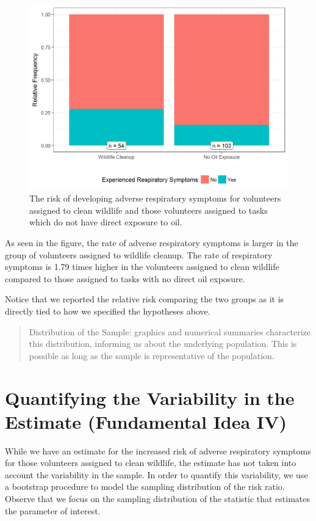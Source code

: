 \documentclass[]{book}
\theoremstyle{definition}
\theoremstyle{definition}
\theoremstyle{remark}
\begin{document}
\begin{figure}

{\centering \includegraphics[width=0.8\linewidth]{./Images/recaplanguage-deepwater-plot-1} 

}

\caption{The risk of developing adverse respiratory symptoms for volunteers assigned to clean wildlife and those volunteers assigned to tasks which do not have direct exposure to oil.}\label{fig:recaplanguage-deepwater-plot}
\end{figure}

As seen in the figure, the rate of adverse respiratory symptoms is
larger in the group of volunteers assigned to wildlife cleanup. The rate
of respiratory symptoms is 1.79 times higher in the volunteers assigned
to clean wildlife compared to those assigned to tasks with no direct oil
exposure.

Notice that we reported the relative risk comparing the two groups as it
is directly tied to how we specified the hypotheses above.

\begin{quote}
Distribution of the Sample: graphics and numerical summaries
characterize this distribution, informing us about the underlying
population. This is possible as long as the sample is representative of
the population.
\end{quote}

\section{Quantifying the Variability in the Estimate (Fundamental Idea
IV)}\label{quantifying-the-variability-in-the-estimate-fundamental-idea-iv}

While we have an estimate for the increased risk of adverse respiratory
symptoms for those volunteers assigned to clean wildlife, the estimate
has not taken into account the variability in the sample. In order to
quantify this variability, we use a bootstrap procedure to model the
sampling distribution of the risk ratio. Observe that we focus on the
sampling distribution of the statistic that estimates the parameter of
interest.
\end{document}

